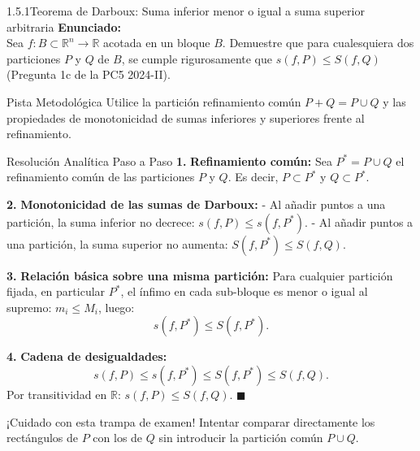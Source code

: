 \documentclass[11pt,a4paper]{article}
\begin{document}
\begin{nivelbox}{1.5.1}{Teorema de Darboux: Suma inferior menor o igual a suma superior arbitraria}
\textbf{Enunciado:}\\
Sea $f: B \subset \mathbb{R}^n \to \mathbb{R}$ acotada en un bloque $B$. Demuestre que para cualesquiera dos particiones $P$ y $Q$ de $B$, se cumple rigurosamente que $s(f, P) \le S(f, Q)$ (Pregunta 1c de la PC5 2024-II).

\begin{observacionbox}{Pista Metodológica}
Utilice la partición refinamiento común $P + Q = P \cup Q$ y las propiedades de monotonicidad de sumas inferiores y superiores frente al refinamiento.
\end{observacionbox}

\begin{ejerciciobox}{Resolución Analítica Paso a Paso}
\smallskip\noindent\textbf{1.} \textbf{Refinamiento común:}
Sea $P^* = P \cup Q$ el refinamiento común de las particiones $P$ y $Q$. Es decir, $P \subset P^*$ y $Q \subset P^*$.

\smallskip\noindent\textbf{2.} \textbf{Monotonicidad de las sumas de Darboux:}
- Al añadir puntos a una partición, la suma inferior no decrece: $s(f, P) \le s(f, P^*)$.
- Al añadir puntos a una partición, la suma superior no aumenta: $S(f, P^*) \le S(f, Q)$.

\smallskip\noindent\textbf{3.} \textbf{Relación básica sobre una misma partición:}
Para cualquier partición fijada, en particular $P^*$, el ínfimo en cada sub-bloque es menor o igual al supremo: $m_i \le M_i$, luego:
\[s(f, P^*) \le S(f, P^*).\]

\smallskip\noindent\textbf{4.} \textbf{Cadena de desigualdades:}
\[s(f, P) \le s(f, P^*) \le S(f, P^*) \le S(f, Q).\]
Por transitividad en $\mathbb{R}$: $s(f, P) \le S(f, Q)$. $\blacksquare$
\end{ejerciciobox}

\begin{errorbox}{¡Cuidado con esta trampa de examen!}
Intentar comparar directamente los rectángulos de $P$ con los de $Q$ sin introducir la partición común $P \cup Q$.
\end{errorbox}
\end{nivelbox}
\bigskip
\end{document}
